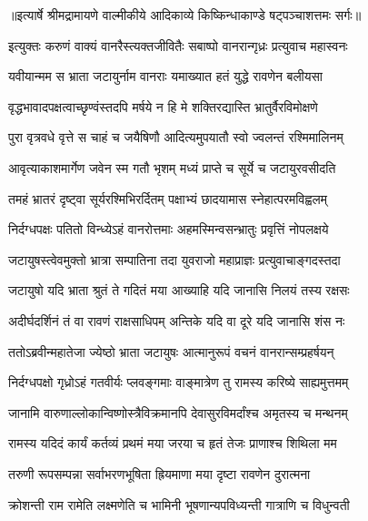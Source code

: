 {॥इत्यार्षे श्रीमद्रामायणे वाल्मीकीये आदिकाव्ये किष्किन्धाकाण्डे षट्पञ्चाशत्तमः सर्गः॥}


\twolineshloka
{इत्युक्तः करुणं वाक्यं वानरैस्त्यक्तजीवितैः}
{सबाष्पो वानरान्गृध्रः प्रत्युवाच महास्वनः} %

\twolineshloka
{यवीयान्मम स भ्राता जटायुर्नाम वानराः}
{यमाख्यात हतं युद्धे रावणेन बलीयसा} %

\twolineshloka
{वृद्धभावादपक्षत्वाच्छृण्वंस्तदपि मर्षये}
{न हि मे शक्तिरद्यास्ति भ्रातुर्वैरविमोक्षणे} %

\twolineshloka
{पुरा वृत्रवधे वृत्ते स चाहं च जयैषिणौ}
{आदित्यमुपयातौ स्वो ज्वलन्तं रश्मिमालिनम्} %

\twolineshloka
{आवृत्याकाशमार्गेण जवेन स्म गतौ भृशम्}
{मध्यं प्राप्ते च सूर्ये च जटायुरवसीदति} %

\twolineshloka
{तमहं भ्रातरं दृष्ट्वा सूर्यरश्मिभिरर्दितम्}
{पक्षाभ्यं छादयामास स्नेहात्परमविह्वलम्} %

\twolineshloka
{निर्दग्धपक्षः पतितो विन्ध्येऽहं वानरोत्तमाः}
{अहमस्मिन्वसन्भ्रातुः प्रवृत्तिं नोपलक्षये} %

\twolineshloka
{जटायुषस्त्वेवमुक्तो भ्रात्रा सम्पातिना तदा}
{युवराजो महाप्राज्ञः प्रत्युवाचाङ्गदस्तदा} %

\twolineshloka
{जटायुषो यदि भ्राता श्रुतं ते गदितं मया}
{आख्याहि यदि जानासि निलयं तस्य रक्षसः} %

\twolineshloka
{अदीर्घदर्शिनं तं वा रावणं राक्षसाधिपम्}
{अन्तिके यदि वा दूरे यदि जानासि शंस नः} %

\twolineshloka
{ततोऽब्रवीन्महातेजा ज्येष्ठो भ्राता जटायुषः}
{आत्मानुरूपं वचनं वानरान्सम्प्रहर्षयन्} %

\twolineshloka
{निर्दग्धपक्षो गृध्रोऽहं गतवीर्यः प्लवङ्गमाः}
{वाङ्मात्रेण तु रामस्य करिष्ये साह्यमुत्तमम्} %

\twolineshloka
{जानामि वारुणाल्लोकान्विष्णोस्त्रैविक्रमानपि}
{देवासुरविमर्दांश्च अमृतस्य च मन्थनम्} %

\twolineshloka
{रामस्य यदिदं कार्यं कर्तव्यं प्रथमं मया}
{जरया च हृतं तेजः प्राणाश्च शिथिला मम} %

\twolineshloka
{तरुणी रूपसम्पन्ना सर्वाभरणभूषिता}
{ह्रियमाणा मया दृष्टा रावणेन दुरात्मना} %

\twolineshloka
{क्रोशन्ती राम रामेति लक्ष्मणेति च भामिनी}
{भूषणान्यपविध्यन्ती गात्राणि च विधुन्वती} %

